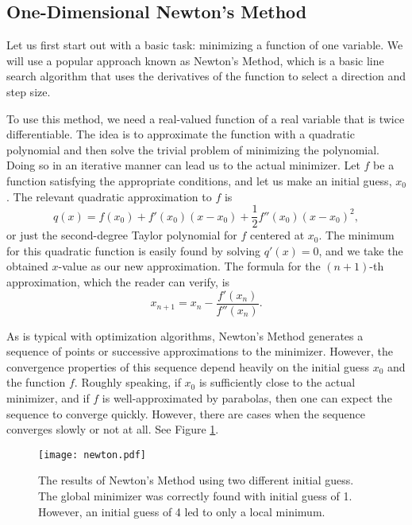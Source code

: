 \subsection*{One-Dimensional Newton's Method}
Let us first start out with a basic task: minimizing a function of one variable.
We will use a popular approach known as Newton's Method, which is a basic line search
algorithm that uses the derivatives of the function to select a direction and
step size.

To use this method, we need a real-valued function of a real variable that is twice
differentiable. The idea is to approximate the function with a quadratic polynomial and
then solve the trivial problem of minimizing the polynomial. Doing so in an iterative
manner can lead us to the actual minimizer. Let $f$ be a function satisfying the
appropriate conditions, and let us make an initial guess, $x_0$. The relevant quadratic
approximation to $f$ is
\begin{equation*}
q(x) = f(x_0) + f'(x_0)(x-x_0) + \frac{1}{2}f''(x_0)(x-x_0)^2,
\end{equation*}
or just the second-degree Taylor polynomial for $f$ centered at $x_0$. The minimum
for this quadratic function is easily found by solving $q'(x) = 0$, and we take the
obtained $x$-value as our new approximation. The formula for the $(n+1)$-th
approximation, which the reader can verify, is
\begin{equation*}
x_{n+1} = x_n - \frac{f'(x_n)}{f''(x_n)}.
\end{equation*}

As is typical with optimization algorithms, Newton's Method generates a sequence of
points or successive approximations to the minimizer. However, the convergence
properties of this sequence depend heavily on the initial guess $x_0$ and the function
$f$. Roughly speaking, if $x_0$ is sufficiently close to the actual minimizer, and if
$f$ is well-approximated by parabolas, then one can expect the sequence to converge
quickly. However, there are cases when the sequence converges slowly or not at all.
See Figure \ref{linesearch:newton}.

\begin{figure}
\centering
\texttt{[image: newton.pdf]}
\caption{The results of Newton's Method using two
different initial guess. The global minimizer was
correctly found with initial guess of 1. However,
an initial guess of 4 led to only a local minimum.}
\label{linesearch:newton}
\end{figure}

